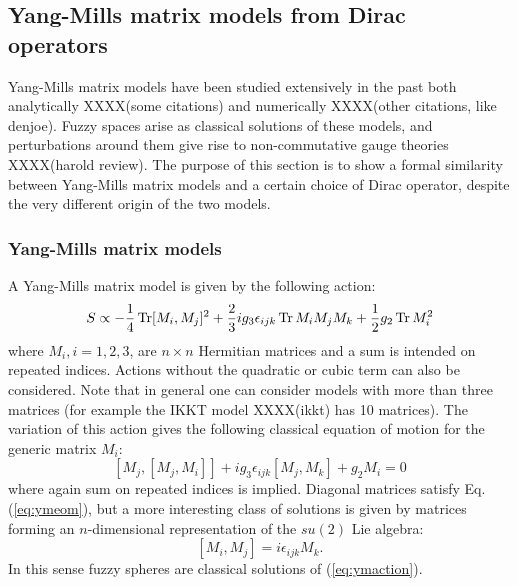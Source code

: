 \subsection{Yang-Mills matrix models from Dirac operators}
Yang-Mills matrix models have been studied extensively in the past both analytically XXXX(some citations) and numerically XXXX(other citations, like denjoe). Fuzzy spaces arise as classical solutions of these models, and perturbations around them give rise to non-commutative gauge theories XXXX(harold review).\newline
The purpose of this section is to show a formal similarity between Yang-Mills matrix models and a certain choice of Dirac operator, despite the very different origin of the two models.\newline

\subsubsection{Yang-Mills matrix models}
A Yang-Mills matrix model is given by the following action:
\begin{equation}\label{eq:ymaction}
S \propto -\frac{1}{4} \operatorname{Tr} [M_i, M_j]^2 + \frac{2}{3} i g_3 \epsilon_{ijk} \operatorname{Tr} M_i M_j M_k + \frac{1}{2} g_2 \operatorname{Tr} M_i^2
\end{equation}
where $M_i, i=1,2,3$, are $n \times n$ Hermitian matrices and a sum is intended on repeated indices. Actions without the quadratic or cubic term can also be considered. Note that in general one can consider models with more than three matrices (for example the IKKT model XXXX(ikkt) has 10 matrices).\newline
The variation of this action gives the following classical equation of motion for the generic matrix $M_i$:
\begin{equation}\label{eq:ymeom}
[M_j, [M_j, M_i]] + i g_3 \epsilon_{ijk}[M_j, M_k] + g_2 M_i = 0
\end{equation}
where again sum on repeated indices is implied. Diagonal matrices satisfy Eq.(\ref{eq:ymeom}), but a more interesting class of solutions is given by matrices forming an $n$-dimensional representation of the $su(2)$ Lie algebra:
\begin{equation}\label{eq:ymsol}
[M_i, M_j] = i \epsilon_{ijk} M_k.
\end{equation}
In this sense fuzzy spheres are classical solutions of (\ref{eq:ymaction}).

